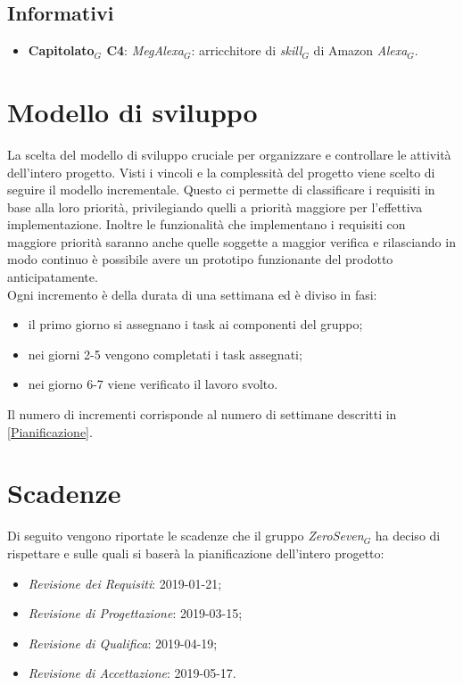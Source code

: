\subsection{Informativi}
\begin{itemize}
	\item \textbf{Capitolato$_{G}$  C4}: \textit{MegAlexa$_{G}$}: arricchitore di \textit{skill$_{G}$} di Amazon \textit{Alexa$_{G}$}.
\end{itemize}
\section{Modello  di sviluppo}
\label{Modello di sviluppo}
La scelta del modello di sviluppo cruciale per organizzare e controllare le attività dell'intero progetto. Visti i vincoli e la complessità del progetto viene scelto di seguire il modello incrementale. Questo ci permette di classificare i requisiti in base alla loro priorità, privilegiando quelli a priorità maggiore per l'effettiva implementazione. Inoltre le funzionalità che implementano i requisiti con maggiore priorità saranno anche quelle soggette a maggior verifica e rilasciando in modo continuo è possibile avere un prototipo funzionante del prodotto anticipatamente. \\
Ogni incremento è della durata di una settimana ed è diviso in fasi:
\begin{itemize}
	\item il primo giorno si assegnano i task ai componenti del gruppo;
	\item nei giorni 2-5 vengono completati i task assegnati;
	\item nei giorno 6-7 viene verificato il lavoro svolto.
\end{itemize}
Il numero di incrementi corrisponde al numero di settimane descritti in \ref{Pianificazione}.
\section{Scadenze}
Di seguito vengono riportate le scadenze che il gruppo \textit{ZeroSeven$_{G}$} ha deciso di rispettare e sulle quali si baserà la pianificazione dell'intero progetto:
\begin{itemize}
	\item \textit{Revisione dei Requisiti}: 2019-01-21;
	\item \textit{Revisione di Progettazione}: 2019-03-15;
	\item \textit{Revisione di Qualifica}: 2019-04-19;
	\item \textit{Revisione di Accettazione}: 2019-05-17.
\end{itemize}